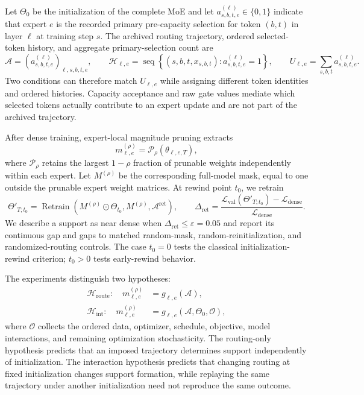 \documentclass{article}
\begin{document}
Let $\Theta_0$ be the initialization of the complete MoE and let
$a_{s,b,t,e}^{(\ell)}\in\{0,1\}$ indicate that expert $e$ is the recorded
primary pre-capacity selection for token $(b,t)$ in layer $\ell$ at training
step $s$. The archived routing trajectory, ordered selected-token history, and
aggregate primary-selection count are
\begin{equation}
\mathcal{A}
=
\left(a_{s,b,t,e}^{(\ell)}\right)_{\ell,s,b,t,e},
\qquad
\mathcal{H}_{\ell,e}
=
\operatorname{seq}
\left\{
(s,b,t,x_{s,b,t}):a_{s,b,t,e}^{(\ell)}=1
\right\},
\qquad
U_{\ell,e}
=
\sum_{s,b,t}a_{s,b,t,e}^{(\ell)}.
\label{eq:routing_objects}
\end{equation}
Two conditions can therefore match $U_{\ell,e}$ while assigning different
token identities and ordered histories. Capacity acceptance and raw gate values
mediate which selected tokens actually contribute to an expert update and are
not part of the archived trajectory.

After dense training, expert-local magnitude pruning extracts
\begin{equation}
m_{\ell,e}^{(\rho)}
=
\mathcal{P}_{\rho}\!\left(\theta_{\ell,e,T}\right),
\label{eq:expert_mask}
\end{equation}
where $\mathcal{P}_{\rho}$ retains the largest $1-\rho$ fraction of prunable
weights independently within each expert. Let $M^{(\rho)}$ be the corresponding
full-model mask, equal to one outside the prunable expert weight matrices. At
rewind point $t_0$, we retrain
\begin{equation}
\Theta'_{T;t_0}
=
\operatorname{Retrain}
\left(
M^{(\rho)}\odot\Theta_{t_0},
M^{(\rho)},
\mathcal{A}^{\mathrm{ret}}
\right),
\qquad
\Delta_{\mathrm{ret}}
=
\frac{
\mathcal{L}_{\mathrm{val}}(\Theta'_{T;t_0})
-
\mathcal{L}_{\mathrm{dense}}
}{
\mathcal{L}_{\mathrm{dense}}
}.
\label{eq:rewind_criterion}
\end{equation}
We describe a support as near dense when
$\Delta_{\mathrm{ret}}\leq\varepsilon=0.05$ and report its continuous gap and
gaps to matched random-mask, random-reinitialization, and randomized-routing
controls. The case $t_0=0$ tests the classical initialization-rewind criterion;
$t_0>0$ tests early-rewind behavior.

The experiments distinguish two hypotheses:
\begin{align}
\mathcal{H}_{\mathrm{route}}:\quad
m_{\ell,e}^{(\rho)}
&=
g_{\ell,e}(\mathcal{A}),
\label{eq:routing_only}\\
\mathcal{H}_{\mathrm{int}}:\quad
m_{\ell,e}^{(\rho)}
&=
g_{\ell,e}(\mathcal{A},\Theta_0,\mathcal{O}),
\label{eq:interaction}
\end{align}
where $\mathcal{O}$ collects the ordered data, optimizer, schedule, objective,
model interactions, and remaining optimization stochasticity. The routing-only
hypothesis predicts that an imposed trajectory determines support independently
of initialization. The interaction hypothesis predicts that changing routing
at fixed initialization changes support formation, while replaying the same
trajectory under another initialization need not reproduce the same outcome.
\end{document}
